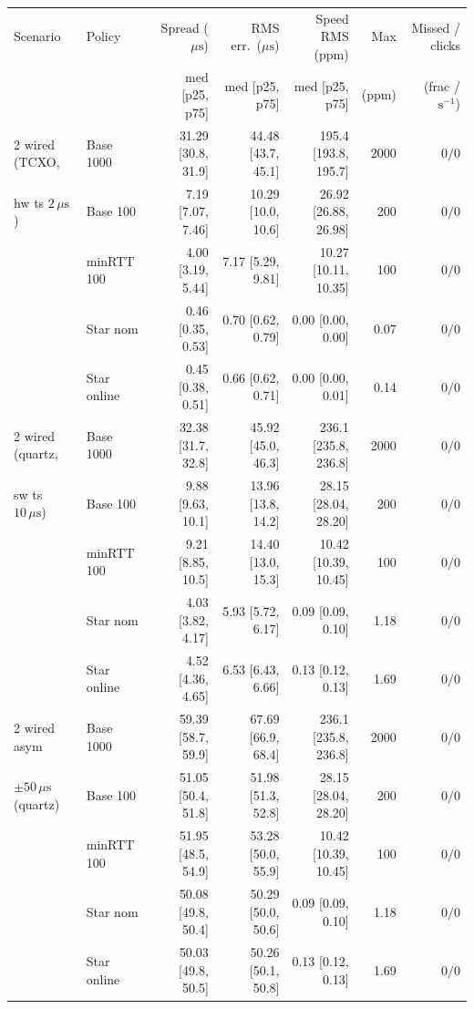 \documentclass[11pt,a4paper]{article}
\theoremstyle{definition}
\begin{document}
\begin{table}[htb]
\centering
\footnotesize
\setlength{\tabcolsep}{2.6pt}
\begin{tabular}{@{}ll r r r r r@{}}
\toprule
Scenario & Policy & Spread ($\mu\text{s}$) & RMS err.\ ($\mu\text{s}$) & Speed RMS (ppm) & Max & Missed / clicks \\
 & & med [p25, p75] & med [p25, p75] & med [p25, p75] & (ppm) & (frac / $\text{s}^{-1}$) \\
\midrule
2 wired (TCXO, & Base 1000  & 31.29 [30.8, 31.9] & 44.48 [43.7, 45.1] & 195.4 [193.8, 195.7] & 2000 & $0 / 0$ \\
hw ts $2\,\mu\text{s}$) & Base 100 & 7.19 [7.07, 7.46] & 10.29 [10.0, 10.6] & 26.92 [26.88, 26.98] & 200 & $0 / 0$ \\
 & minRTT 100 & 4.00 [3.19, 5.44] & 7.17 [5.29, 9.81] & 10.27 [10.11, 10.35] & 100 & $0 / 0$ \\
 & Star nom & 0.46 [0.35, 0.53] & 0.70 [0.62, 0.79] & 0.00 [0.00, 0.00] & 0.07 & $0 / 0$ \\
 & Star online & 0.45 [0.38, 0.51] & 0.66 [0.62, 0.71] & 0.00 [0.00, 0.01] & 0.14 & $0 / 0$ \\
\midrule
2 wired (quartz, & Base 1000 & 32.38 [31.7, 32.8] & 45.92 [45.0, 46.3] & 236.1 [235.8, 236.8] & 2000 & $0 / 0$ \\
sw ts $10\,\mu\text{s}$) & Base 100 & 9.88 [9.63, 10.1] & 13.96 [13.8, 14.2] & 28.15 [28.04, 28.20] & 200 & $0 / 0$ \\
 & minRTT 100 & 9.21 [8.85, 10.5] & 14.40 [13.0, 15.3] & 10.42 [10.39, 10.45] & 100 & $0 / 0$ \\
 & Star nom & 4.03 [3.82, 4.17] & 5.93 [5.72, 6.17] & 0.09 [0.09, 0.10] & 1.18 & $0 / 0$ \\
 & Star online & 4.52 [4.36, 4.65] & 6.53 [6.43, 6.66] & 0.13 [0.12, 0.13] & 1.69 & $0 / 0$ \\
\midrule
2 wired asym & Base 1000 & 59.39 [58.7, 59.9] & 67.69 [66.9, 68.4] & 236.1 [235.8, 236.8] & 2000 & $0 / 0$ \\
$\pm 50\,\mu\text{s}$ (quartz) & Base 100 & 51.05 [50.4, 51.8] & 51.98 [51.3, 52.8] & 28.15 [28.04, 28.20] & 200 & $0 / 0$ \\
 & minRTT 100 & 51.95 [48.5, 54.9] & 53.28 [50.0, 55.9] & 10.42 [10.39, 10.45] & 100 & $0 / 0$ \\
 & Star nom & 50.08 [49.8, 50.4] & 50.29 [50.0, 50.6] & 0.09 [0.09, 0.10] & 1.18 & $0 / 0$ \\
 & Star online & 50.03 [49.8, 50.5] & 50.26 [50.1, 50.8] & 0.13 [0.12, 0.13] & 1.69 & $0 / 0$ \\

\end{tabular}
\end{table}
\end{document}
